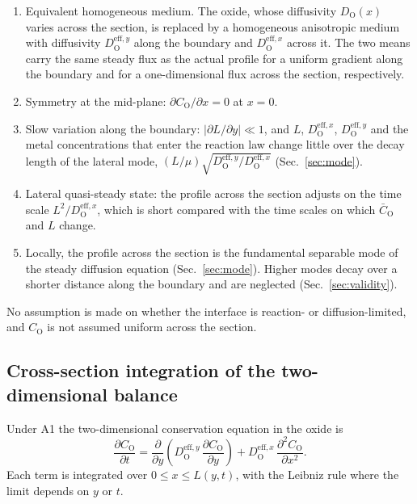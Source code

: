 \documentclass[12pt]{article}
\newcommand{\eff}{\mathrm{eff}}
\newcommand{\Ox}{\mathrm{O}}
\newcommand{\Dx}{D_{\Ox}^{\eff,x}}
\newcommand{\Dy}{D_{\Ox}^{\eff,y}}
\newcommand{\Cb}{\bar{C}_{\Ox}}
\begin{document}
\begin{enumerate}
  \item[A1.] Equivalent homogeneous medium. The oxide, whose diffusivity
        \(D_{\Ox}(x)\) varies across the section, is replaced by a homogeneous
        anisotropic medium with diffusivity \(\Dy\) along the boundary and
        \(\Dx\) across it. The two means carry the same steady flux as the
        actual profile for a uniform gradient along the boundary and for a
        one-dimensional flux across the section, respectively.
  \item[A2.] Symmetry at the mid-plane: \(\partial C_{\Ox}/\partial x=0\) at
        \(x=0\).
  \item[A3.] Slow variation along the boundary:
        \(|\partial L/\partial y|\ll1\), and \(L\), \(\Dx\), \(\Dy\) and the
        metal concentrations that enter the reaction law change little over
        the decay length of the lateral mode,
        \((L/\mu)\sqrt{\Dy/\Dx}\) (Sec.~\ref{sec:mode}).
  \item[A4.] Lateral quasi-steady state: the profile across the section
        adjusts on the time scale \(L^{2}/\Dx\), which is short compared with
        the time scales on which \(\Cb\) and \(L\) change.
  \item[A5.] Locally, the profile across the section is the fundamental
        separable mode of the steady diffusion equation
        (Sec.~\ref{sec:mode}). Higher modes decay over a shorter distance
        along the boundary and are neglected (Sec.~\ref{sec:validity}).
\end{enumerate}
No assumption is made on whether the interface is reaction- or
diffusion-limited, and \(C_{\Ox}\) is not assumed uniform across the section.

\subsection{Cross-section integration of the two-dimensional balance}
\label{sec:integration}

Under A1 the two-dimensional conservation equation in the oxide is
\begin{equation}
\frac{\partial C_{\Ox}}{\partial t}
 =\frac{\partial}{\partial y}\!\left(\Dy\,\frac{\partial C_{\Ox}}{\partial y}\right)
 +\Dx\,\frac{\partial^2 C_{\Ox}}{\partial x^2}.
\label{eq:2d}
\end{equation}
Each term is integrated over \(0\le x\le L(y,t)\), with the Leibniz rule
where the limit depends on \(y\) or \(t\).
\end{document}
